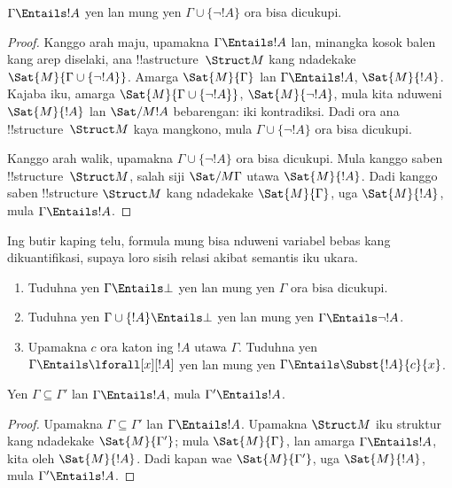 \documentclass[../../../include/open-logic-section]{subfiles}
\begin{document}
\begin{prop}
$\Gamma \Entails !A$ yen lan mung yen
$\Gamma \cup \{\lnot !A\}$ ora bisa dicukupi.
\end{prop}

\begin{proof}
Kanggo arah maju, upamakna $\Gamma \Entails !A$ lan,
minangka kosok balen kang arep diselaki, ana
!!a{structure}~$\Struct M$ kang ndadekake
$\Sat{M}{\Gamma
  \cup \{ \lnot !A \}}$. Amarga $\Sat{M}{\Gamma}$
lan $\Gamma \Entails !A$, $\Sat{M}{!A}$.
Kajaba iku, amarga $\Sat{M}{\Gamma\cup \{ \lnot !A \}}$,
$\Sat{M}{\lnot !A}$, mula kita nduweni
$\Sat{M}{!A}$ lan $\Sat/{M}{!A}$ bebarengan:
iki kontradiksi. Dadi ora ana !!{structure}~$\Struct M$
kaya mangkono, mula $\Gamma \cup \{ \lnot !A \}$
ora bisa dicukupi.

Kanggo arah walik, upamakna
$\Gamma \cup \{ \lnot !A \}$ ora bisa dicukupi.
Mula kanggo saben !!{structure}~$\Struct M$,
salah siji $\Sat/{M}{\Gamma}$ utawa $\Sat{M}{!A}$.
Dadi kanggo saben !!{structure} $\Struct M$ kang
ndadekake $\Sat{M}{\Gamma}$, uga $\Sat{M}{!A}$,
mula $\Gamma \Entails !A$.
\end{proof}

\begin{prob}
Ing butir kaping telu, formula mung bisa nduweni variabel bebas kang dikuantifikasi, supaya loro sisih relasi akibat semantis iku ukara.
\begin{enumerate}
\item Tuduhna yen $\Gamma \Entails \bot$ yen lan mung yen
  $\Gamma$ ora bisa dicukupi.
\item Tuduhna yen $\Gamma \cup \{!A\} \Entails \bot$
  yen lan mung yen $\Gamma \Entails \lnot !A$.
\item Upamakna $c$ ora katon ing $!A$ utawa $\Gamma$.
  Tuduhna yen $\Gamma \Entails \lforall[x][!A]$
  yen lan mung yen $\Gamma \Entails
  \Subst{!A}{c}{x}$.
\end{enumerate}
\end{prob}

\begin{prop}
Yen $\Gamma \subseteq \Gamma'$ lan $\Gamma \Entails !A$,
mula $\Gamma' \Entails !A$.
\end{prop}

\begin{proof}
Upamakna $\Gamma \subseteq \Gamma'$ lan
$\Gamma \Entails !A$. Upamakna $\Struct M$ iku
struktur kang ndadekake $\Sat{M}{\Gamma'}$;
mula $\Sat{M}{\Gamma}$, lan amarga
$\Gamma \Entails !A$, kita oleh $\Sat{M}{!A}$.
Dadi kapan wae $\Sat{M}{\Gamma'}$, uga
$\Sat{M}{!A}$, mula $\Gamma' \Entails !A$.
\end{proof}
\end{document}
